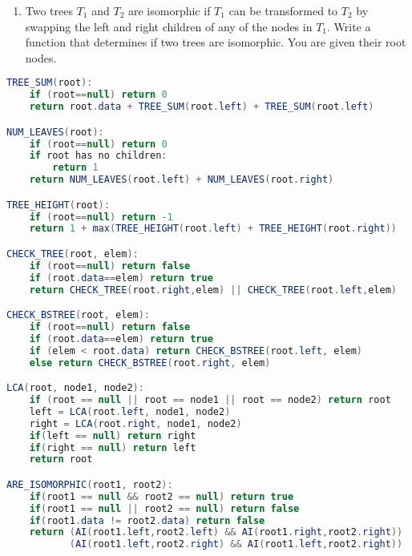 \documentclass{article}
\begin{document}
\begin{enumerate}

\item Two trees $T_1$ and $T_2$ are isomorphic if $T_1$ can be transformed to $T_2$ by swapping the left and right children of any of the nodes in $T_1$. Write a function that determines if two trees are isomorphic. You are given their root nodes.

\end{enumerate}

\clearpage

\begin{lstlisting}[language=Java]
TREE_SUM(root):
    if (root==null) return 0
    return root.data + TREE_SUM(root.left) + TREE_SUM(root.left)

NUM_LEAVES(root):
    if (root==null) return 0
    if root has no children:
        return 1
    return NUM_LEAVES(root.left) + NUM_LEAVES(root.right)

TREE_HEIGHT(root):
    if (root==null) return -1
    return 1 + max(TREE_HEIGHT(root.left) + TREE_HEIGHT(root.right))

CHECK_TREE(root, elem):
    if (root==null) return false
    if (root.data==elem) return true
    return CHECK_TREE(root.right,elem) || CHECK_TREE(root.left,elem)

CHECK_BSTREE(root, elem):
    if (root==null) return false
    if (root.data==elem) return true
    if (elem < root.data) return CHECK_BSTREE(root.left, elem)
    else return CHECK_BSTREE(root.right, elem)

LCA(root, node1, node2):
    if (root == null || root == node1 || root == node2) return root
    left = LCA(root.left, node1, node2)
    right = LCA(root.right, node1, node2)
    if(left == null) return right
    if(right == null) return left
    return root

ARE_ISOMORPHIC(root1, root2):
    if(root1 == null && root2 == null) return true
    if(root1 == null || root2 == null) return false
    if(root1.data != root2.data) return false
    return (AI(root1.left,root2.left) && AI(root1.right,root2.right)) ||
           (AI(root1.left,root2.right) && AI(root1.left,root2.right))

\end{lstlisting}






\end{document}
